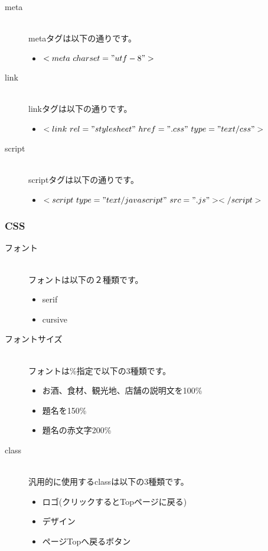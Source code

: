 \documentclass[a4j,titlepage]{jarticle}
\begin{document}
\begin{description}
\item [meta]~\\
metaタグは以下の通りです。

\begin{itemize}
\item $<meta\ charset = "utf-8">$
\end{itemize}


\item [link]~\\
linkタグは以下の通りです。

\begin{itemize}
\item $<link\ rel="stylesheet"\ href=".css"\ type="text/css">$
\end{itemize}


\item [script]~\\
scriptタグは以下の通りです。

\begin{itemize}
\item $<script\ type="text/javascript"\ src=".js"></script>$
\end{itemize}
\end{description}

\subsubsection{CSS}
\begin{description}
\item [フォント]~\\
フォントは以下の２種類です。

\begin{itemize}
\item serif
\item cursive
\end{itemize}

\item [フォントサイズ]~\\
フォントは\%指定で以下の3種類です。

\begin{itemize}
\item お酒、食材、観光地、店舗の説明文を100\%
\item 題名を150\%
\item 題名の赤文字200\%
\end{itemize}


\item [class]~\\
汎用的に使用するclassは以下の3種類です。

\begin{itemize}
\item ロゴ(クリックするとTopページに戻る)
\item デザイン
\item ページTopへ戻るボタン
\end{itemize}
\end{description}
\end{document}
